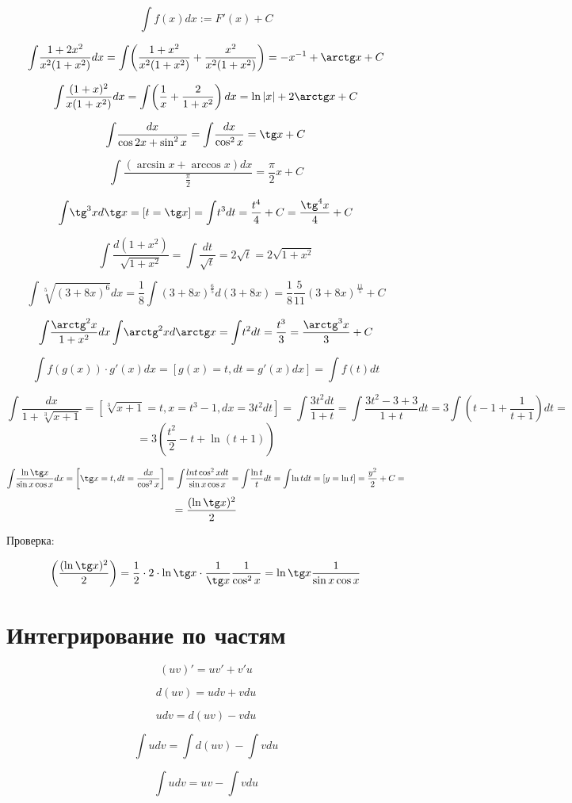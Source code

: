 $$\int\! f(x)dx:=F'(x) + C$$

$$\int\! \frac{1+2x^2}{x^2(1+x^2)}dx=\int\! \left(\frac{1+x^2}{x^2(1+x^2)} + \frac{x^2}{x^2(1+x^2)} \right)=-x^{-1}+\arctg x + C$$

$$\int\! \frac{(1+x)^2}{x(1+x^2)}dx=\int\! \left( \frac{1}{x} + \frac{2}{1+x^2} \right)dx=\ln|x|+2\arctg x + C$$

$$\int\! \frac{dx}{\cos 2x + \sin^2 x}=\int\! \frac{dx}{\cos^2x}=\tg x + C$$

$$\int\! \frac{(\arcsin x + \arccos x) dx}{\frac{\pi}{2}}=\frac{\pi}{2}x+C$$

$$\int\! \tg^3 x d\tg x=[t=\tg x]=\int\! t^3dt=\frac{t^4}{4}+C=\frac{\tg ^4 x}{4}+C$$

$$\int\! \frac{d(1+x^2)}{\sqrt{1+x^2}}=\int\! \frac{dt}{\sqrt t}=2\sqrt t=2\sqrt{1+x^2}$$

$$\int\! \sqrt[5]{(3+8x)^6}dx=\frac{1}{8}\int\! (3+8x)^{\frac{6}{5}}d(3+8x)=\frac{1}{8}\frac{5}{11}(3+8x)^{\frac{11}{5}}+C$$

$$\int\! \frac{\arctg^2 x}{1+x^2}dx\int\! \arctg^2 x d\arctg x=\int\! t^2dt=\frac{t^3}{3}=\frac{\arctg^3 x}{3}+C$$

$$\int\! f(g(x))\cdot g'(x)dx=[g(x) = t, dt = g'(x)dx] = \int\! f(t)dt$$

$$\int\! \frac{dx}{1+\sqrt[3]{x+1}}=[\sqrt[3]{x+1}=t, x = t^3 -1, dx = 3t^2dt]=\int\! \frac{3t^2dt}{1+t}=\int\! \frac{3t^2-3+3}{1+t}dt=3\int\! (t-1+\frac{1}{t+1})dt=$$
$$=3(\frac{t^2}{2}-t+\ln(t+1))$$

$$\int\! \frac{\ln \tg x}{\sin x \cos x}dx=\left[\tg x = t, dt = \frac{dx}{\cos^2x}\right]=\int\! \frac{ln t \cos^2 xdt}{\sin x \cos x}=\int\! \frac{\ln t}{t}dt=\int\! \ln t dt=[y=\ln t]=\frac{y^2}{2}+C=$$
$$=\frac{(\ln\tg x)^2}{2}$$

Проверка:

$$\left(\frac{(\ln\tg x)^2}{2}\right)=\frac{1}{2}\cdot 2\cdot \ln\tg x\cdot \frac{1}{\tg x}\frac{1}{\cos^2 x}=\ln\tg x \frac{1}{\sin x\cos x}$$

\section{Интегрирование по частям}

$$(uv)'=uv'+v'u$$

$$d(uv)=udv+vdu$$

$$udv = d(uv) - vdu$$

$$\int\! udv = \int\! d(uv) - \int\! vdu$$

$$\int\! udv = uv - \int\! vdu$$

